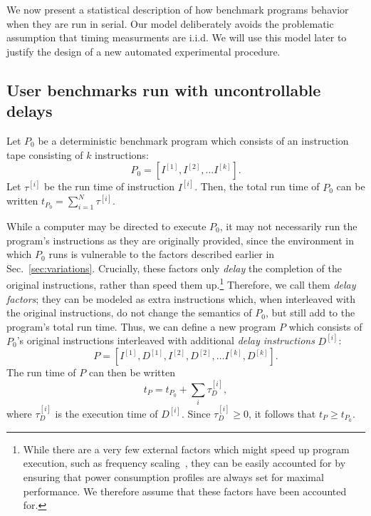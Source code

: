 \documentclass[conference]{IEEEtran}
\begin{document}
We now present a statistical description of how benchmark programs behavior
when they are run in serial. Our model deliberately avoids the problematic
assumption that timing measurments are i.i.d. We will use this model later to
justify the design of a new automated experimental procedure.

\subsection{User benchmarks run with uncontrollable delays}
\label{sec:programmodel}

Let $P_0$ be a deterministic benchmark program which consists of an instruction tape
consisting of $k$ instructions:
%
\begin{equation}
    P_0 = \left[I^{[1]}, I^{[2]}, \dots I^{[k]}\right].
\end{equation}
%
Let $\tau^{[i]}$ be the run time of instruction $I^{[i]}$. Then, the total run
time of $P_0$ can be written $t_{P_0} = \sum_{i=1}^N \tau^{[i]}$.

While a computer may be directed to execute $P_0$, it may not necessarily run the program's
instructions as they are originally provided, since the environment in which $P_0$
runs is vulnerable to the factors described earlier in Sec.~\ref{sec:variations}. Crucially,
these factors only \textit{delay} the completion of the original instructions, rather than
speed them up.\footnote{While there are a very few external factors which might speed up
program execution, such as frequency scaling~\cite{RHEL6}, they can be easily accounted for
by ensuring that power consumption profiles are always set for maximal performance. We
therefore assume that these factors have been accounted for.} Therefore, we call them
\textit{delay factors}; they can be modeled as extra instructions which, when
interleaved with the original instructions, do not change the semantics of
$P_0$, but still add to the program's total run time. Thus, we can define a new
program $P$ which consists of $P_0$'s original instructions interleaved with
additional \textit{delay instructions} $D^{[i]}$:
%
\begin{equation}
    P = \left[I^{[1]}, D^{[1]}, I^{[2]}, D^{[2]}, \dots I^{[k]}, D^{[k]}\right].
\end{equation}
%
The run time of $P$ can then be written
%
\begin{equation}
    t_P = t_{P_0} + \sum_{i} \tau^{[i]}_D,
\end{equation}
%
where $\tau^{[i]}_D$ is the execution time of $D^{[i]}$. Since $\tau^{[i]}_D \ge 0$, it
follows that $t_P \ge t_{P_0}$.
\end{document}
